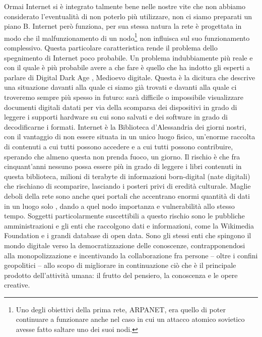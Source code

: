 Ormai Internet si è integrato talmente bene nelle nostre vite che non abbiamo considerato
l’eventualità di non poterlo più utilizzare, non ci siamo preparati un piano B. Internet però
funziona, per sua stessa natura la rete è progettata in modo che il malfunzionamento di un
nodo\footnote{Uno degli obiettivi della prima rete, ARPANET, era quello di poter continuare a funzionare anche nel caso in cui un attacco atomico
sovietico avesse fatto saltare uno dei suoi nodi.} non influisca sul suo funzionamento complessivo. Questa particolare caratteristica
rende il problema dello spegnimento di Internet poco probabile. Un problema
indubbiamente più reale e con il quale è più probabile avere a che fare è quello che ha
indotto gli esperti a parlare di Digital Dark Age \parencite{maci2012b,ghosh}, Medioevo digitale.
Questa è la dicitura che descrive una situazione davanti alla quale ci siamo già trovati e
davanti alla quale ci troveremo sempre più spesso in futuro: sarà difficile o impossibile
visualizzare documenti digitali datati per via della scomparsa dei dispositivi in grado di
leggere i supporti hardware su cui sono salvati e dei software in grado di decodificarne i
formati. Internet è la Biblioteca d’Alessandria dei giorni nostri, con il vantaggio di non essere
situata in un unico luogo fisico, un’enorme raccolta di contenuti a cui tutti possono accedere
e a cui tutti possono contribuire, sperando che almeno questa non prenda fuoco, un giorno.
Il rischio è che fra cinquant’anni nessuno possa essere più in grado di leggere i libri contenuti
in questa biblioteca, milioni di terabyte di informazioni born-digital (nate digitali) che
rischiano di scomparire, lasciando i posteri privi di eredità culturale. Maglie deboli della rete
sono anche quei portali che accentrano enormi quantità di dati in un luogo solo \parencite{rossi},
dando a quel nodo importanza e vulnerabilità allo stesso tempo. Soggetti particolarmente
suscettibili a questo rischio sono le pubbliche amministrazioni \parencite{maci2012a} e gli enti che
raccolgono dati e informazioni, come la Wikimedia Foundation e i grandi database di open
data. Sono gli stessi enti che spingono il mondo digitale verso la democratizzazione delle
conoscenze, contrapponendosi alla monopolizzazione e incentivando la collaborazione fra
persone – oltre i confini geopolitici – allo scopo di migliorare in continuazione ciò che è il
principale prodotto dell’attività umana: il frutto del pensiero, la conoscenza e le opere
creative.